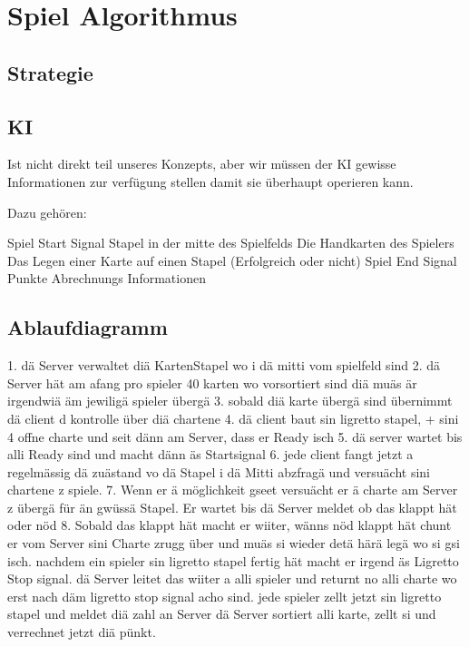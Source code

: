 \section{Spiel Algorithmus} 

\subsection{Strategie}

\subsection{KI}

Ist nicht direkt teil unseres Konzepts, aber wir müssen der KI gewisse Informationen zur verfügung stellen damit sie überhaupt operieren kann.

Dazu gehören:

Spiel Start Signal
Stapel in der mitte des Spielfelds
Die Handkarten des Spielers
Das Legen einer Karte auf einen Stapel (Erfolgreich oder nicht)
Spiel End Signal
Punkte Abrechnungs Informationen

\subsection{Ablaufdiagramm}

1. dä Server verwaltet diä KartenStapel wo i dä mitti vom spielfeld sind
			2. dä Server hät am afang pro spieler 40 karten wo vorsortiert sind diä muäs är irgendwiä äm jewiligä spieler übergä
			3. sobald diä karte übergä sind übernimmt dä client d kontrolle über diä chartene
			4. dä client baut sin ligretto stapel, + sini 4 offne charte und seit dänn am Server, dass er Ready isch
			5. dä server wartet bis alli Ready sind und macht dänn äs Startsignal
			6. jede client fangt jetzt a regelmässig dä zuästand vo dä Stapel i dä Mitti abzfragä und versuächt sini chartene z spiele.
			7. Wenn er ä möglichkeit gseet versuächt er ä charte am Server z übergä für än gwüssä Stapel. Er wartet bis dä Server meldet ob das klappt hät oder nöd
			8. Sobald das klappt hät macht er wiiter, wänns nöd klappt hät chunt er vom Server sini Charte zrugg über und muäs si wieder detä härä legä wo si gsi isch.
			nachdem ein spieler sin ligretto stapel fertig hät macht er irgend äs Ligretto Stop signal. dä Server leitet das wiiter a alli spieler und returnt no alli charte wo erst nach däm ligretto stop signal acho sind.
			jede spieler zellt jetzt sin ligretto stapel und meldet diä zahl an Server
			dä Server sortiert alli karte, zellt si und verrechnet jetzt diä pünkt.
			
